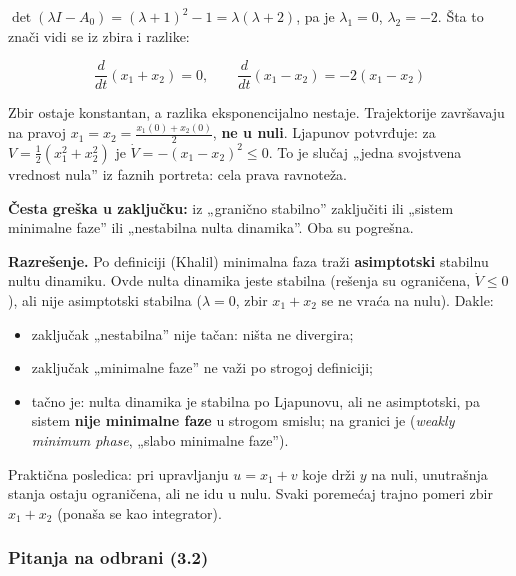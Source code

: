 \documentclass[11pt,a4paper,parskip=half,headsepline,numbers=noenddot]{scrartcl}
\begin{document}
\(\det(\lambda I - A_0) = (\lambda + 1)^2 - 1 = \lambda(\lambda + 2)\), pa je \(\lambda_1 = 0\), \(\lambda_2 = -2\). Šta to znači vidi se iz zbira i razlike:

\[\frac{d}{dt}(x_1 + x_2) = 0, \qquad \frac{d}{dt}(x_1 - x_2) = -2(x_1 - x_2)\]

Zbir ostaje konstantan, a razlika eksponencijalno nestaje. Trajektorije završavaju na pravoj \(x_1 = x_2 = \frac{x_1(0) + x_2(0)}{2}\), \textbf{ne u nuli}. Ljapunov potvrđuje: za \(V = \frac12(x_1^2 + x_2^2)\) je \(\dot V = -(x_1 - x_2)^2 \le 0\). To je slučaj „jedna svojstvena vrednost nula'' iz faznih portreta: cela prava ravnoteža.

\textbf{Česta greška u zaključku:} iz „granično stabilno'' zaključiti ili „sistem minimalne faze'' ili „nestabilna nulta dinamika''. Oba su pogrešna.

\textbf{Razrešenje.} Po definiciji (Khalil) minimalna faza traži \textbf{asimptotski} stabilnu nultu dinamiku. Ovde nulta dinamika jeste stabilna (rešenja su ograničena, \(\dot V \le 0\)), ali nije asimptotski stabilna (\(\lambda = 0\), zbir \(x_1 + x_2\) se ne vraća na nulu). Dakle:

\begin{itemize}
\item zaključak „nestabilna'' nije tačan: ništa ne divergira;
\item zaključak „minimalne faze'' ne važi po strogoj definiciji;
\item tačno je: nulta dinamika je stabilna po Ljapunovu, ali ne asimptotski, pa sistem \textbf{nije minimalne faze} u strogom smislu; na granici je (\emph{weakly minimum phase}, „slabo minimalne faze'').
\end{itemize}

Praktična posledica: pri upravljanju \(u = x_1 + v\) koje drži \(y\) na nuli, unutrašnja stanja ostaju ograničena, ali ne idu u nulu. Svaki poremećaj trajno pomeri zbir \(x_1 + x_2\) (ponaša se kao integrator).

\subsubsection{Pitanja na odbrani (3.2)}
\end{document}
